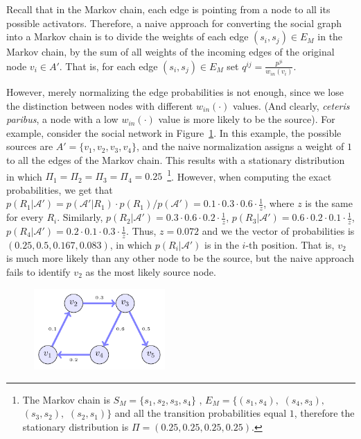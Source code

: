 \documentclass[sigconf,anonymous]{aamas}
\newcommand{\set}[1]{\{#1\}}
\begin{document}
Recall that in the Markov chain, each edge is pointing from a node to all its possible activators. Therefore, a naive approach for converting the social graph into a Markov chain is to divide the weights of each edge $(s_i,s_j)\in E_M$ in the Markov chain, by the sum of all weights of the incoming edges of the original node $v_i\in A'$. That is, for each edge $(s_i,s_j) \in E_M$ %
 set $q^{ij} = \frac{p^{ji}}{w_{in}(v_i)}$. 
%

However, %
merely normalizing the edge probabilities is %
not enough, since we lose the distinction between nodes with different $w_{in}(\cdot)$ values. (And clearly, \textit{ceteris paribus}, a node with a low $w_{in}(\cdot)$ value is more likely to be the source). 
For example, consider the social network in Figure~\ref{fig:simple_ex}.
In this example, the possible sources are $A'=\set{v_1,v_2,v_3,v_4}$, and the naive normalization assigns a weight of $1$ to all the edges of the Markov chain. This results with a stationary distribution in which $\Pi_1 = \Pi_2 = \Pi_3 = \Pi_4 = 0.25$~\footnote{The Markov chain is $S_M=\{s_1,s_2,s_3,s_4\}$ , $E_M=\{(s_1,s_4),$ $(s_4,s_3),$ $(s_3,s_2),$ $(s_2,s_1)\}$ and all the transition probabilities equal $1$, therefore the stationary distribution is $\Pi=(0.25,0.25,0.25,0.25)$.}. 
However, when computing the exact probabilities, we get that 
$p(R_1|\mathcal{A'})=p(\mathcal{A'}|R_1) \cdot p(R_1)/p(\mathcal{A'}) = 0.1\cdot 0.3\cdot 0.6 \cdot \frac{1}{z}$, where $z$ is the same for every $R_i$. Similarly, $p(R_2|\mathcal{A'})=0.3\cdot 0.6\cdot 0.2 \cdot \frac{1}{z}$,
$p(R_3|\mathcal{A'})=0.6\cdot 0.2\cdot 0.1 \cdot \frac{1}{z}$,
$p(R_4|\mathcal{A'})=0.2\cdot 0.1\cdot 0.3 \cdot \frac{1}{z}$. Thus, $z= 0.072$ and we the vector of probabilities is $(0.25,0.5,0.167,0.083)$, in which  $p(R_i|\mathcal{A'})$ is in the $i$-th position. That is, $v_2$ is much more likely than any other node to be the source, but the naive approach fails to identify $v_2$ as the most likely source node. 


\begin{figure}[hbpt] 
    \centering
    \includegraphics[width= 5cm]{simple_graph_example_for_regular_normalization.pdf}
  \caption{}
    \label{fig:simple_ex}
\end{figure}
\end{document}
